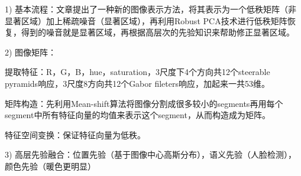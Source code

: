 \documentclass[a4paper,12pt]{article}
\begin{document}
1) 基本流程：文章提出了一种新的图像表示方法，将其表示为一个低秩矩阵（非显著区域）加上稀疏噪音（显著区域），再利用Robust PCA技术进行低秩矩阵恢复，得到的噪音就是显著区域，再根据高层次的先验知识来帮助修正显著区域。

2) 图像矩阵：

 提取特征：R，G，B，hue，saturation，3尺度下4个方向共12个steerable pyramids响应，3尺度8方向共12个Gabor fileters响应，加起来一共53维。

 矩阵构造：先利用Mean-shift算法将图像分割成很多较小的segments再用每个segment中所有特征向量的均值来表示这个segment，从而构造成为矩阵。

 特征空间变换：保证特征向量为低秩。

3) 高层先验融合：位置先验（基于图像中心高斯分布），语义先验（人脸检测），颜色先验（暖色更明显）

\end{document}
